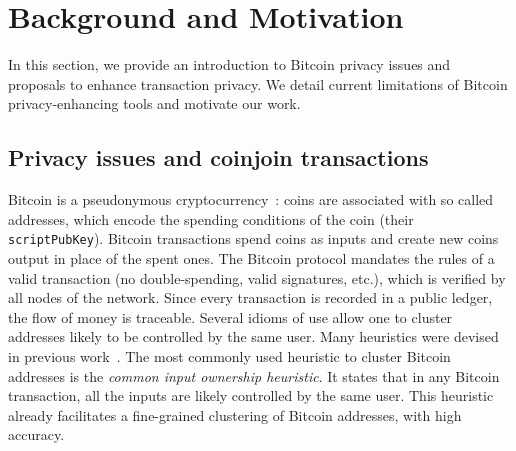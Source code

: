 \documentclass[a4paper]{article}
\begin{document}
\section{Background and Motivation} \label{sec:background}

In this section, we provide an introduction to Bitcoin privacy issues and proposals to enhance transaction privacy. We detail current limitations of Bitcoin privacy-enhancing tools and motivate our work.

\subsection{Privacy issues and coinjoin transactions}

Bitcoin is a pseudonymous cryptocurrency~\cite{nakamoto2009bitcoin}: coins are associated with so called addresses, which encode the spending conditions of the coin (their \texttt{scriptPubKey}). Bitcoin transactions spend coins as inputs and create new coins output in place of the spent ones. The Bitcoin protocol mandates the rules of a valid transaction (no double-spending, valid signatures, etc.), which is verified by all nodes of the network. Since every transaction is recorded in a public ledger, the flow of money is traceable. Several idioms of use allow one to cluster addresses likely to be controlled by the same user. Many heuristics were devised in previous work~\cite{meiklejohn2013fistful,androulaki2013evaluating,reid2013analysis,ron2013quantitative}. The most commonly used heuristic to cluster Bitcoin addresses is the \emph{common input ownership heuristic}. It states that in any Bitcoin transaction, all the inputs are likely controlled by the same user. This heuristic already facilitates a fine-grained clustering of Bitcoin addresses, with high accuracy\cite{nick2015data}.
\end{document}
